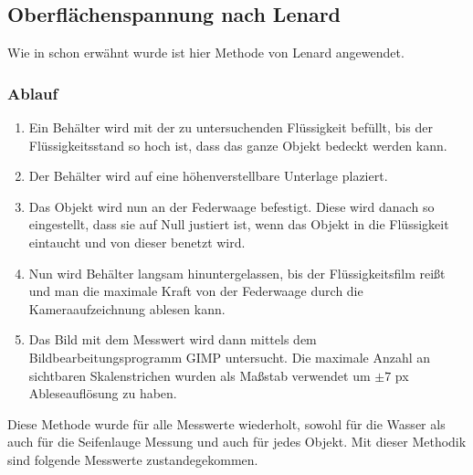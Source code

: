 \documentclass[11pt]{scrartcl}
\begin{document}
\subsection{Oberflächenspannung nach Lenard}
Wie in  schon erwähnt wurde ist hier
Methode von Lenard angewendet.
\subsubsection{Ablauf}
\begin{enumerate}
    \item Ein Behälter wird mit der zu untersuchenden Flüssigkeit befüllt,
        bis der Flüssigkeitsstand so hoch ist, dass das ganze Objekt bedeckt
        werden kann.
    \item Der Behälter wird auf eine höhenverstellbare Unterlage plaziert.
    \item Das Objekt wird nun an der Federwaage befestigt. Diese wird danach so 
        eingestellt, dass sie auf Null justiert ist, wenn das Objekt 
        in die Flüssigkeit eintaucht und von dieser benetzt wird.
    \item Nun wird Behälter langsam hinuntergelassen, bis der Flüssigkeitsfilm
        reißt und man die maximale Kraft von der Federwaage durch
        die Kameraaufzeichnung ablesen kann.
    \item Das Bild mit dem Messwert wird dann mittels dem Bildbearbeitungsprogramm
        GIMP untersucht. Die maximale Anzahl an sichtbaren Skalenstrichen 
        wurden als Maßstab verwendet um $\pm 7$ px Ableseauflösung zu
        haben.
\end{enumerate}
Diese Methode wurde für alle Messwerte wiederholt, sowohl für die Wasser
als auch für die Seifenlauge Messung und auch für jedes Objekt. Mit dieser 
Methodik sind folgende Messwerte zustandegekommen.
\end{document}
